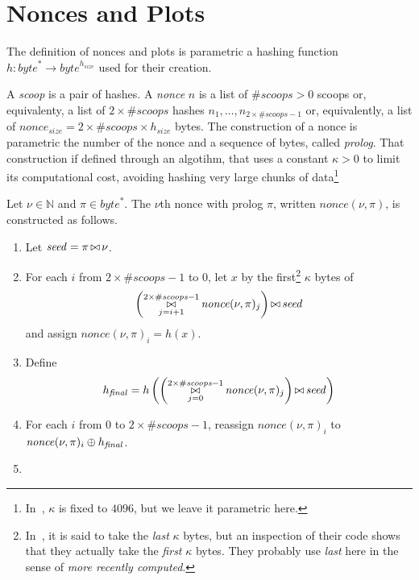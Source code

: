 \section{Nonces and Plots}\label{sec:nonces_and_plots}

\newcommand{\hashsize}{{h_{\mathit{size}}}}
\newcommand{\numberofscoops}{{\#\mathit{scoops}}}
\newcommand{\noncesize}{{\mathit{nonce}_{\mathit{size}}}}
\newcommand{\nonce}{{\mathit{nonce}}}
\newcommand{\seed}{{\mathit{seed}}}
\newcommand{\finalhash}{{h_{\mathit{final}}}}

The definition of nonces and plots is parametric \wrt a hashing
function $h:\mathit{byte}^*\to\mathit{byte}^\hashsize$ used for their creation.

A \emph{scoop} is a pair of hashes. A \emph{nonce} $n$ is a list of
$\numberofscoops>0$ scoops or, equivalenty, a list of $2\times\numberofscoops$
hashes $n_1,\ldots,n_{2\times\numberofscoops-1}$ or, equivalently, a list of
$\noncesize=2\times\numberofscoops\times\hashsize$ bytes.
The construction of a nonce is parametric \wrt the number
of the nonce and a sequence of bytes, called \emph{prolog}.
That construction if defined through an algotihm, that
uses a constant $\kappa>0$ to limit its computational cost, avoiding
hashing very large chunks of data\footnote{In~\cite{SignumPlotting},
$\kappa$ is fixed to $4096$, but we leave it parametric here.}

\begin{definition}[$\nonce(\nu,\pi)$]
  Let $\nu\in\mathbb{N}$ and $\pi\in\mathit{byte}^*$. 
  The $\nu$th nonce with prolog $\pi$, written
  $\nonce(\nu,\pi)$, is constructed as follows.
  \begin{enumerate}
  \item Let $\seed=\pi\append\nu$.
  \item For each $i$ from $2\times\numberofscoops-1$ to $0$, let
    $x$ by the first\footnote{In~\cite{SignumPlotting}, it is said to
  take the \emph{last} $\kappa$ bytes, but an inspection of their code
  shows that they actually take the \emph{first} $\kappa$ bytes. They
  probably use \emph{last} here in the sense of \emph{more recently computed}.}
    $\kappa$ bytes of
    \[
    \left(\append_{j=i+1}^{2\times\numberofscoops-1}\nonce(\nu,\pi)_j\right)\append\seed
    \]
    and assign $\nonce(\nu,\pi)_i=h(x)$.
  \item Define
    \[
    \finalhash=h\left(\left(\append_{j=0}^{2\times\numberofscoops-1}\nonce(\nu,\pi)_j\right)\append\seed\right)
    \]
  \item For each $i$ from $0$ to $2\times\numberofscoops-1$, reassign
    $\nonce(\nu,\pi)_i$ to $\nonce(\nu,\pi)_i\xor\finalhash$.
  \item 
  \end{enumerate}
\end{definition}
